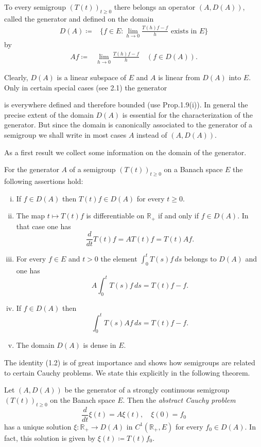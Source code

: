 \begin{definition}\label{def:a1-1.5}
To every semigroup $(T(t))_{t \geq 0}$ there belongs an operator $(A,D(A))$, called the generator and defined on the domain
\begin{align*}
	D(A) \coloneqq{} & \{f \in E \colon \lim_{h\to0} \frac{T(h)f - f}{h} \text{ exists in } E\}
\end{align*}
by
\begin{align*}
	Af \coloneqq{} & \lim_{h\to0} \frac{T(h)f - f}{h} \quad (f \in D(A)).
\end{align*}
\end{definition}
Clearly, $D(A)$ is a linear subspace of $E$ and $A$ is linear from $D(A)$ into $E$.
Only in certain special cases (see 2.1) the generator

\newpage

is everywhere defined and therefore bounded (use Prop.1.9(i)).
In general the precise extent of the domain $D(A)$ is essential for the characterization of the generator.
But since the domain is canonically associated to the generator of a semigroup we shall write in most cases $A$ instead of $(A,D(A))$.

As a first result we collect some information on the domain of the generator.
\begin{proposition}\label{prop:a1-1.6}
For the generator $A$ of a semigroup $(T(t))_{t \geq 0}$ on a Banach space $E$ the following assertions hold:
\begin{enumerate}[(i)]
\item
If $f \in D(A)$ then $T(t)f \in D(A)$ for every $t \geq 0$.

\item
The map $t \mapsto T(t)f$ is differentiable on $\mathbb{R}_{+}$ if and only if $f \in D(A)$.
In that case one has
\[
    \frac{d}{dt} T(t)f = AT(t)f = T(t)Af.
\]
\item
For every $f \in E$ and $t > 0$ the element $\int_0^t T(s)f\,ds$ belongs to $D(A)$ and one has
\[
    A\int_0^t T(s)f \,ds = T(t)f - f.
\]
\item
If $f \in D(A)$ then
\[
    \int_0^t T(s)Af \,ds = T(t)f - f.
\]
\item
The domain $D(A)$ is dense in $E$.
\end{enumerate}
\end{proposition}
The identity (1.2) is of great importance and shows how semigroups are related to certain Cauchy problems.
We state this explicitly in the following theorem.
\begin{theorem}\label{thm:a1-1.7}
Let $(A,D(A))$ be the generator of a strongly continuous semigroup $(T(t))_{t \geq 0}$ on the Banach space $E$.
Then the \emph{abstract Cauchy problem}
\begin{equation}\label{eq:a1-1.2}
\frac{d}{dt}\xi(t) = A\xi(t), \quad \xi(0) = f_{0}
\end{equation}
has a unique solution $\xi \colon \mathbb{R}_{+} \to D(A)$ in $C^1(\mathbb{R}_{+},E)$ for every $f_{0} \in D(A)$.
In fact, this solution is given by $\xi(t) \coloneqq T(t)f_{0}$.
\end{theorem}

